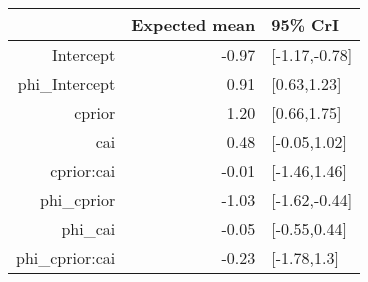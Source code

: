 \begin{tabular}{rrl}
  \hline
 & Expected mean & 95\% CrI \\ 
  \hline
Intercept & -0.97 & [-1.17,-0.78] \\ 
  phi\_Intercept & 0.91 & [0.63,1.23] \\ 
  cprior & 1.20 & [0.66,1.75] \\ 
  cai & 0.48 & [-0.05,1.02] \\ 
  cprior:cai & -0.01 & [-1.46,1.46] \\ 
  phi\_cprior & -1.03 & [-1.62,-0.44] \\ 
  phi\_cai & -0.05 & [-0.55,0.44] \\ 
  phi\_cprior:cai & -0.23 & [-1.78,1.3] \\ 
   \hline
\end{tabular}

